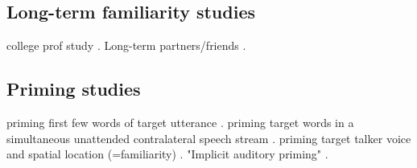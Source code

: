 \subsection{Long-term familiarity studies}
college prof study \citep{NewmanEvers2007}.  Long-term partners/friends \citep{SouzaEtAl2013}.

\subsection{Priming studies}
priming first few words of target utterance \citep{FreymanEtAl2004}.  priming target words in a simultaneous unattended contralateral speech stream \citep{RivenezEtAl2006}.  priming target talker voice and spatial location (=familiarity) \citep{KiddEtAl2005a, KitterickEtAl2010}.  "Implicit auditory priming" \citep{Sommers1999}.

